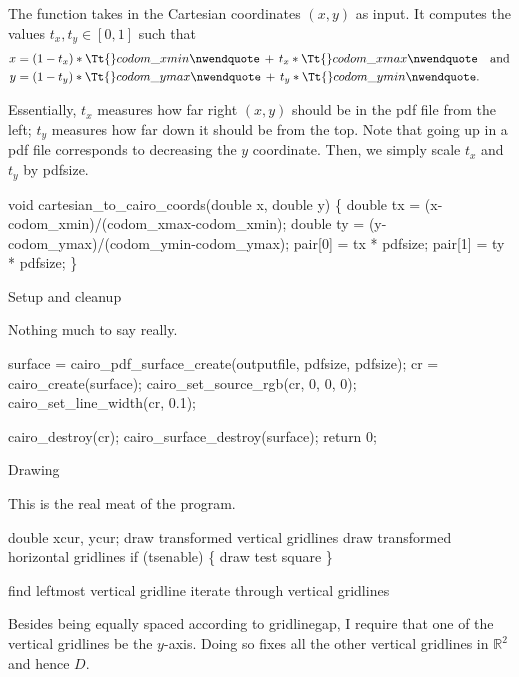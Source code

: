 \documentclass{article}%
\def\R{\mathbb{R}}
\def\heading#1{\noindent\bigbf #1 \rm\par\smallskip}
\begin{document}
The function takes in the Cartesian coordinates $(x,y)$ as input. It computes the values $t_x,t_y \in [0,1]$ such that
\begin{align*}
x &= (1-t_x)*{\Tt{}codom{\_}xmin\nwendquote} \,+\, t_x*{\Tt{}codom{\_}xmax\nwendquote}\quad\hbox{and} \\
y &= (1-t_y)*{\Tt{}codom{\_}ymax\nwendquote} \,+\, t_y*{\Tt{}codom{\_}ymin\nwendquote}.
\end{align*}

Essentially, $t_x$ measures how far right $(x,y)$ should be in the pdf file from the left; $t_y$ measures how far down it should be from the top. Note that going up in a pdf file corresponds to decreasing the $y$ coordinate. Then, we simply scale $t_x$ and $t_y$ by {\Tt{}pdfsize\nwendquote}.

\nwenddocs{}\endmoddef\nwstartdeflinemarkup\nwenddeflinemarkup
void cartesian_to_cairo_coords(double x, double y) \{
        double tx = (x-codom_xmin)/(codom_xmax-codom_xmin);
        double ty = (y-codom_ymax)/(codom_ymin-codom_ymax);
        pair[0] = tx * pdfsize;
        pair[1] = ty * pdfsize;
\}

\nwendcode{}\heading{Setup and cleanup}
Nothing much to say really.

\nwenddocs{}\endmoddef\nwstartdeflinemarkup\nwenddeflinemarkup
surface = cairo_pdf_surface_create(outputfile, pdfsize, pdfsize);
cr = cairo_create(surface);
cairo_set_source_rgb(cr, 0, 0, 0);
cairo_set_line_width(cr, 0.1);

\nwendcode{}\endmoddef\nwstartdeflinemarkup\nwenddeflinemarkup
cairo_destroy(cr);
cairo_surface_destroy(surface);
return 0;

\nwendcode{}\heading{Drawing}
This is the real meat of the program.

\nwenddocs{}\endmoddef\nwstartdeflinemarkup\nwenddeflinemarkup
double xcur, ycur;
\LA{}draw transformed vertical gridlines\RA{}
\LA{}draw transformed horizontal gridlines\RA{}
if (tsenable) \{
        \LA{}draw test square\RA{}
\}

\nwendcode{}\endmoddef\nwstartdeflinemarkup\nwenddeflinemarkup
\LA{}find leftmost vertical gridline\RA{}
\LA{}iterate through vertical gridlines\RA{}

\nwendcode{}Besides being equally spaced according to {\Tt{}gridlinegap\nwendquote}, I require that one of the vertical gridlines be the $y$-axis. Doing so fixes all the other vertical gridlines in $\R^2$ and hence $D$.
\end{document}
